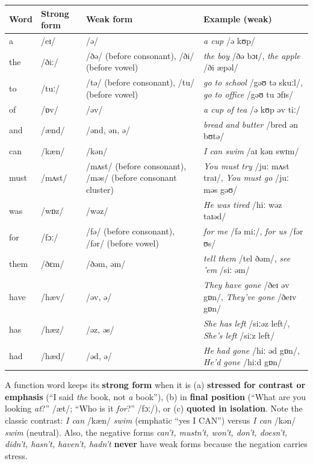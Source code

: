 \documentclass[11pt]{article}
\begin{document}
\begin{center}
\begin{tabularx}{\linewidth}{|l|X|X|X|}
\hline
\rowcolor{popblueL} \textbf{Word} & \textbf{Strong form} & \textbf{Weak form} & \textbf{Example (weak)} \\
\hline
a & /eɪ/ & /ə/ & \emph{a cup} /ə kʊp/ \\
\hline
the & /ðiː/ & /ðə/ (before consonant), /ði/ (before vowel) & \emph{the boy} /ðə bɔɪ/, \emph{the apple} /ði æpəl/ \\
\hline
to & /tuː/ & /tə/ (before consonant), /tu/ (before vowel) & \emph{go to school} /gəʊ tə skuːl/, \emph{go to office} /gəʊ tu ɔfɪs/ \\
\hline
of & /ɒv/ & /əv/ & \emph{a cup of tea} /ə kʊp əv tiː/ \\
\hline
and & /ænd/ & /ənd, ən, ə/ & \emph{bread and butter} /bred ən bʊtə/ \\
\hline
can & /kæn/ & /kən/ & \emph{I can swim} /aɪ kən swɪm/ \\
\hline
must & /mʌst/ & /mʌst/ (before consonant), /məs/ (before consonant cluster) & \emph{You must try} /juː mʌst traɪ/, \emph{You must go} /juː məs gəʊ/ \\
\hline
was & /wɒz/ & /wəz/ & \emph{He was tired} /hiː wəz taɪəd/ \\
\hline
for & /fɔː/ & /fə/ (before consonant), /fər/ (before vowel) & \emph{for me} /fə miː/, \emph{for us} /fər ʊs/ \\
\hline
them & /ðɛm/ & /ðəm, əm/ & \emph{tell them} /tel ðəm/, \emph{see 'em} /siː əm/ \\
\hline
have & /hæv/ & /əv, ə/ & \emph{They have gone} /ðeɪ əv gɒn/, \emph{They've gone} /ðeɪv gɒn/ \\
\hline
has & /hæz/ & /əz, əs/ & \emph{She has left} /siːəz left/, \emph{She's left} /siːz left/ \\
\hline
had & /hæd/ & /əd, ə/ & \emph{He had gone} /hiː əd gɒn/, \emph{He'd gone} /hiːd gɒn/ \\
\hline
\end{tabularx}
\end{center}

\begin{propriete}
A function word keeps its \textbf{strong form} when it is (a) \textbf{stressed for contrast or emphasis} (``I said \emph{the} book, not \emph{a} book''), (b) in \textbf{final position} (``What are you looking \emph{at}?'' /æt/; ``Who is it \emph{for}?'' /fɔː/), or (c) \textbf{quoted in isolation}. Note the classic contrast: \emph{I can} /kæn/ \emph{swim} (emphatic ``yes I CAN'') versus \emph{I can} /kən/ \emph{swim} (neutral). Also, the negative forms \emph{can't, mustn't, won't, don't, doesn't, didn't, hasn't, haven't, hadn't} \textbf{never} have weak forms because the negation carries stress.
\end{propriete}
\end{document}
